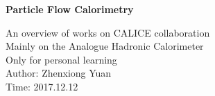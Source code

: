 

\thispagestyle{empty}
\begin{center}
  \renewcommand{\baselinestretch}{2.00}
  \Large\bfseries\sffamily 
  \vspace*{2\baselineskip}
    Particle Flow Calorimetry
  \par
  \vfill
  \large\normalfont
  An overview of works on CALICE collaboration\\
  Mainly on the Analogue Hadronic Calorimeter\\
  Only for personal learning\\
  Author: Zhenxiong Yuan\\
  Time: 2017.12.12
\end{center}\par


\renewcommand{\baselinestretch}{1.00}\normalsize